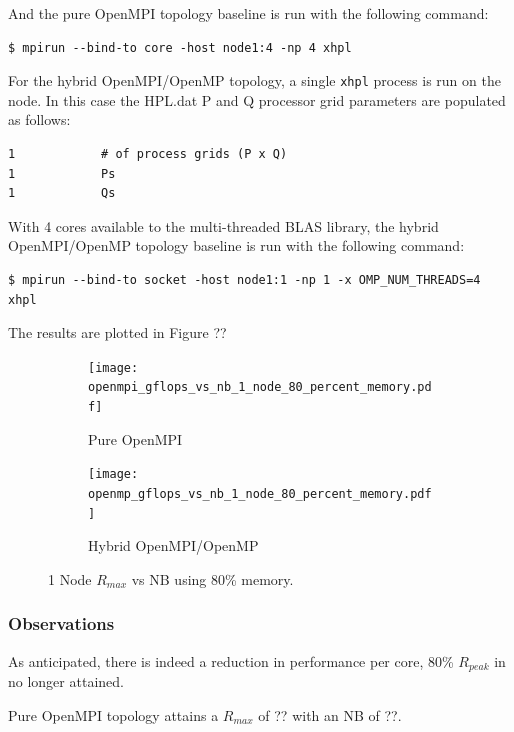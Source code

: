 \documentclass{report}
\begin{document}
And the pure OpenMPI topology baseline is run with the following command:

\lstset{style=type}
\begin{lstlisting}[]
$ mpirun --bind-to core -host node1:4 -np 4 xhpl
\end{lstlisting}

For the hybrid OpenMPI/OpenMP topology, a single \verb|xhpl| process is run on the node. In this case the HPL.dat P and Q processor grid parameters are populated as follows:

\lstset{style=listing}
\begin{lstlisting}[numbers=none]
1            # of process grids (P x Q)
1            Ps
1            Qs
\end{lstlisting}

With 4 cores available to the multi-threaded BLAS library, the hybrid OpenMPI/OpenMP topology baseline is run with the following command:

\lstset{style=type}
\begin{lstlisting}[]
$ mpirun --bind-to socket -host node1:1 -np 1 -x OMP_NUM_THREADS=4 xhpl
\end{lstlisting}

The results are plotted in Figure ??

\begin{figure}[H]
	\begin{subfigure}{1.0\textwidth}
		\centering
		\texttt{[image: openmpi\_gflops\_vs\_nb\_1\_node\_80\_percent\_memory.pdf]}
		\caption{Pure OpenMPI}
		\label{fig:subim1}
	\end{subfigure}
	\par\bigskip
	\begin{subfigure}{1.0\textwidth}
		\centering
		\texttt{[image: openmp\_gflops\_vs\_nb\_1\_node\_80\_percent\_memory.pdf]}
		\caption{Hybrid OpenMPI/OpenMP}
		\label{fig:subim2}
	\end{subfigure}
\caption{1 Node $R_{max}$ vs NB using 80\% memory.}
\label{fig:image2}
\end{figure}


%
%
\subsubsection{Observations}

As anticipated, there is indeed a reduction in performance per core, 80\% $R_{peak}$ in no longer attained.

Pure OpenMPI topology attains a $R_{max}$ of ?? with an NB of ??.
\end{document}
